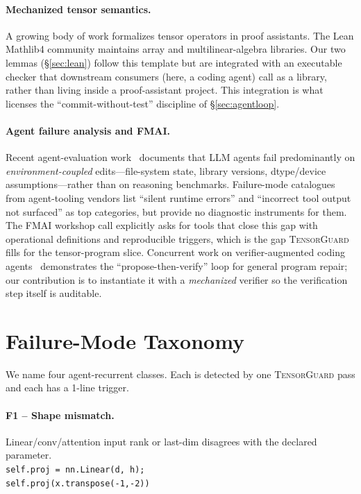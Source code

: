 \documentclass{article}
\begin{document}
\paragraph{Mechanized tensor semantics.}
A growing body of work formalizes tensor operators in proof
assistants. The Lean Mathlib4 community maintains array and
multilinear-algebra libraries.
Our two lemmas (\S\ref{sec:lean})
follow this template but are integrated with an executable
checker that downstream consumers (here, a coding agent) call as
a library, rather than living inside a proof-assistant project.
This integration is what licenses the ``commit-without-test''
discipline of \S\ref{sec:agentloop}.

\paragraph{Agent failure analysis and FMAI.}
Recent agent-evaluation work~\citep{swebench,agentbench,taubench}
documents that LLM agents fail predominantly on
\emph{environment-coupled} edits---file-system state, library
versions, dtype/device assumptions---rather than on reasoning
benchmarks. Failure-mode catalogues from agent-tooling vendors
\citep{langchainfm} list ``silent runtime errors''
and ``incorrect tool output not surfaced'' as top categories, but
provide no diagnostic instruments for them. The FMAI workshop
call explicitly asks for tools that close this gap with
operational definitions and reproducible triggers, which is the
gap \textsc{TensorGuard} fills for the tensor-program slice.
Concurrent work on verifier-augmented coding
agents~\citep{verifiedrepair,sketchrepair} demonstrates the
``propose-then-verify'' loop for general program repair; our
contribution is to instantiate it with a \emph{mechanized}
verifier so the verification step itself is auditable.

\section{Failure-Mode Taxonomy}
\label{sec:taxonomy}

We name four agent-recurrent classes. Each is detected by one
\textsc{TensorGuard} pass and each has a 1-line trigger.

\paragraph{F1 -- Shape mismatch.} Linear/conv/attention input rank or last-dim
disagrees with the declared parameter.\\
{\scriptsize\verb|self.proj = nn.Linear(d, h);|}\\
{\scriptsize\verb|self.proj(x.transpose(-1,-2))|}
\end{document}
